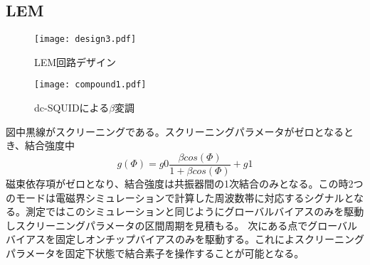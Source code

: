     \subsection{LEM}
    \begin{figure}[H]
        \centering
        \texttt{[image: design3.pdf]}
        \caption{LEM回路デザイン}
        \label{LEM}
    \end{figure}
        \begin{figure}[H]
            \centering
            \texttt{[image: compound1.pdf]}
            \caption{dc-SQUIDによる$\beta$変調}
        \end{figure}
        図中黒線がスクリーニングである。スクリーニングパラメータがゼロとなるとき、結合強度中
        \begin{equation}
            g(\Phi) = g0\frac{\beta cos(\Phi)}{1+\beta cos(\Phi)} + g1
        \end{equation}
        磁束依存項がゼロとなり、結合強度は共振器間の1次結合のみとなる。この時2つのモードは電磁界シミュレーションで計算した周波数帯に対応するシグナルとなる。測定ではこのシミュレーションと同じようにグローバルバイアスのみを駆動しスクリーニングパラメータの区間周期を見積もる。
        次にある点でグローバルバイアスを固定しオンチップバイアスのみを駆動する。これによスクリーニングパラメータを固定下状態で結合素子を操作することが可能となる。
